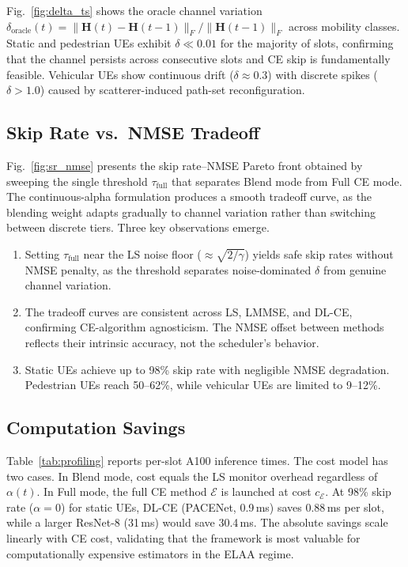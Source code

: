 Fig.~\ref{fig:delta_ts} shows the oracle channel variation $\delta_{\mathrm{oracle}}(t) = \|\mathbf{H}(t) - \mathbf{H}(t{-}1)\|_F / \|\mathbf{H}(t{-}1)\|_F$ across mobility classes.
Static and pedestrian UEs exhibit $\delta \ll 0.01$ for the majority of slots, confirming that the channel persists across consecutive slots and CE skip is fundamentally feasible.
Vehicular UEs show continuous drift ($\delta \approx 0.3$) with discrete spikes ($\delta > 1.0$) caused by scatterer-induced path-set reconfiguration.

\subsection{Skip Rate vs.\ NMSE Tradeoff}

Fig.~\ref{fig:sr_nmse} presents the skip rate--NMSE Pareto front obtained by sweeping the single threshold $\tau_{\mathrm{full}}$ that separates Blend mode from Full CE mode.
The continuous-alpha formulation produces a smooth tradeoff curve, as the blending weight adapts gradually to channel variation rather than switching between discrete tiers.
Three key observations emerge.
\begin{enumerate}
\item Setting $\tau_{\mathrm{full}}$ near the LS noise floor ($\approx\!\sqrt{2/\gamma}$) yields safe skip rates without NMSE penalty, as the threshold separates noise-dominated $\delta$ from genuine channel variation.
\item The tradeoff curves are consistent across LS, LMMSE, and DL-CE, confirming CE-algorithm agnosticism. The NMSE offset between methods reflects their intrinsic accuracy, not the scheduler's behavior.
\item Static UEs achieve up to 98\% skip rate with negligible NMSE degradation. Pedestrian UEs reach 50--62\%, while vehicular UEs are limited to 9--12\%.
\end{enumerate}

\subsection{Computation Savings}

Table~\ref{tab:profiling} reports per-slot A100 inference times.
The cost model has two cases. In Blend mode, cost equals the LS monitor overhead regardless of $\alpha(t)$. In Full mode, the full CE method $\mathcal{E}$ is launched at cost $c_{\mathcal{E}}$.
At 98\% skip rate ($\alpha = 0$) for static UEs, DL-CE (PACENet, 0.9\,ms) saves 0.88\,ms per slot, while a larger ResNet-8 (31\,ms) would save 30.4\,ms.
The absolute savings scale linearly with CE cost, validating that the framework is most valuable for computationally expensive estimators in the ELAA regime.

